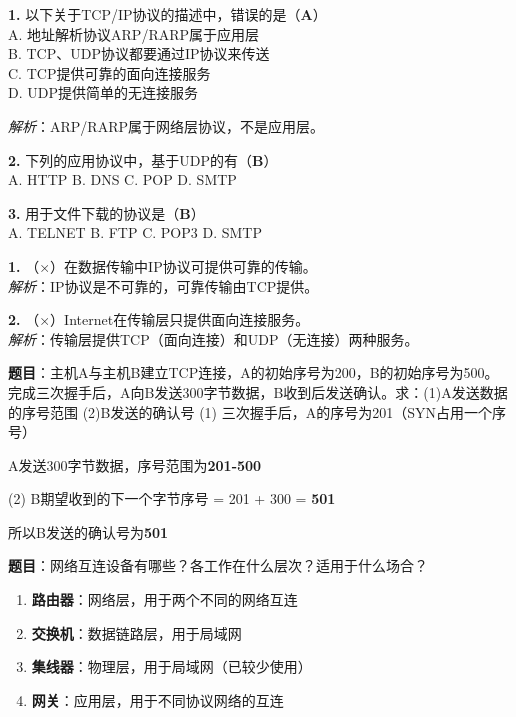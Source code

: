 \begin{examplebox}[选择题]
\textbf{1.} 以下关于TCP/IP协议的描述中，错误的是（\textbf{A}）\\
A. 地址解析协议ARP/RARP属于应用层\\
B. TCP、UDP协议都要通过IP协议来传送\\
C. TCP提供可靠的面向连接服务\\
D. UDP提供简单的无连接服务

\textit{解析}：ARP/RARP属于网络层协议，不是应用层。

\textbf{2.} 下列的应用协议中，基于UDP的有（\textbf{B}）\\
A. HTTP \quad B. DNS \quad C. POP \quad D. SMTP

\textbf{3.} 用于文件下载的协议是（\textbf{B}）\\
A. TELNET \quad B. FTP \quad C. POP3 \quad D. SMTP
\end{examplebox}

\begin{examplebox}[判断题]
\textbf{1.} （×）在数据传输中IP协议可提供可靠的传输。\\
\textit{解析}：IP协议是不可靠的，可靠传输由TCP提供。

\textbf{2.} （×）Internet在传输层只提供面向连接服务。\\
\textit{解析}：传输层提供TCP（面向连接）和UDP（无连接）两种服务。
\end{examplebox}

\begin{examplebox}
\textbf{题目}：主机A与主机B建立TCP连接，A的初始序号为200，B的初始序号为500。完成三次握手后，A向B发送300字节数据，B收到后发送确认。求：(1)A发送数据的序号范围 (2)B发送的确认号
\tcblower
(1) 三次握手后，A的序号为201（SYN占用一个序号）

A发送300字节数据，序号范围为\textbf{201-500}

(2) B期望收到的下一个字节序号 = 201 + 300 = \textbf{501}

所以B发送的确认号为\textbf{501}
\end{examplebox}

\begin{examplebox}
\textbf{题目}：网络互连设备有哪些？各工作在什么层次？适用于什么场合？
\tcblower
\begin{enumerate}[itemsep=0pt]
    \item \textbf{路由器}：网络层，用于两个不同的网络互连
    \item \textbf{交换机}：数据链路层，用于局域网
    \item \textbf{集线器}：物理层，用于局域网（已较少使用）
    \item \textbf{网关}：应用层，用于不同协议网络的互连
\end{enumerate}
\end{examplebox}


